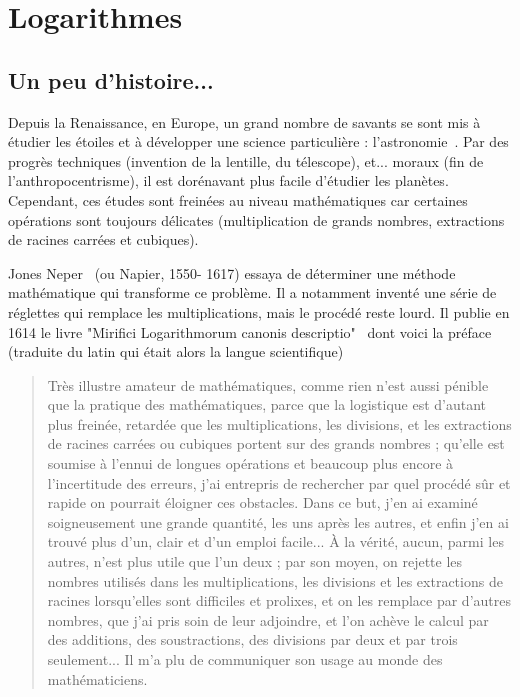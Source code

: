 \chapter{Logarithmes}

\section{Un peu d'histoire...}

Depuis la Renaissance, en Europe, un grand nombre de savants se sont mis à étudier les étoiles et à développer une science particulière : l'astronomie~\cite{astropleiade}. Par des progrès techniques (invention de la lentille, du télescope),  et... moraux (fin de l'anthropocentrisme), il est dorénavant plus facile d'étudier les planètes. Cependant, ces études sont freinées au niveau mathématiques car certaines opérations sont toujours délicates (multiplication de grands nombres, extractions de racines carrées et cubiques).

Jones Neper~ (ou Napier, 1550- 1617) essaya de déterminer une méthode mathématique qui transforme ce problème. Il a notamment inventé une série de réglettes qui remplace les multiplications, mais le procédé reste lourd. Il publie en 1614 le livre "Mirifici Logarithmorum canonis descriptio"~\cite{napier1614} dont voici la préface (traduite du latin qui était alors la langue scientifique)

\begin{quotation}
Très illustre amateur de mathématiques, comme rien n’est aussi pénible que la pratique des
mathématiques, parce que la logistique est d’autant plus freinée, retardée que les
multiplications, les divisions, et les extractions de racines carrées ou cubiques portent sur des
grands nombres ; qu’elle est soumise à l’ennui de longues opérations et beaucoup plus encore
à l’incertitude des erreurs, j’ai entrepris de rechercher par quel procédé sûr et rapide on
pourrait éloigner ces obstacles. Dans ce but, j’en ai examiné soigneusement une grande
quantité, les uns après les autres, et enfin j’en ai trouvé plus d’un, clair et d’un emploi facile...
À la vérité, aucun, parmi les autres, n’est plus utile que l’un deux ; par son moyen, on rejette
les nombres utilisés dans les multiplications, les divisions et les extractions de racines
lorsqu’elles sont difficiles et prolixes, et on les remplace par d’autres nombres, que j’ai pris
soin de leur adjoindre, et l’on achève le calcul par des additions, des soustractions, des
divisions par deux et par trois seulement... Il m’a plu de communiquer son usage au monde
des mathématiciens.
\end{quotation}

